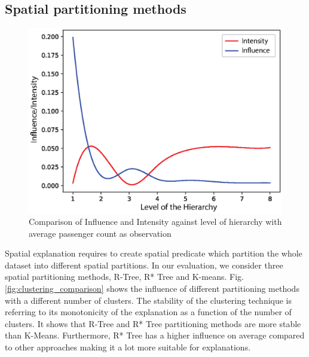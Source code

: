 \subsection{Spatial partitioning methods}
\label{sec:spatial_partitioning_methods}
\begin{figure}[t]
	\includegraphics[width=\columnwidth]{images/hieint_passenger_count}
	\caption{Comparison of Influence and Intensity against level of hierarchy with average passenger count as observation}
	\label{fig:hieint_passenger_count}
\end{figure}
Spatial explanation requires to create spatial predicate which partition the whole dataset into different spatial partitions. In our evaluation, we consider three spatial partitioning methods, R-Tree, R* Tree and K-means. 
Fig. \ref{fig:clustering_comparison} shows the influence of different partitioning methods with a different number of clusters. 
The stability of the clustering technique is referring to its monotonicity of the explanation as a function of the number of clusters. 
It shows that R-Tree and R* Tree partitioning methods are more stable than K-Means. 
Furthermore, R* Tree has a higher influence on average compared to other approaches making it a lot more suitable for explanations.

